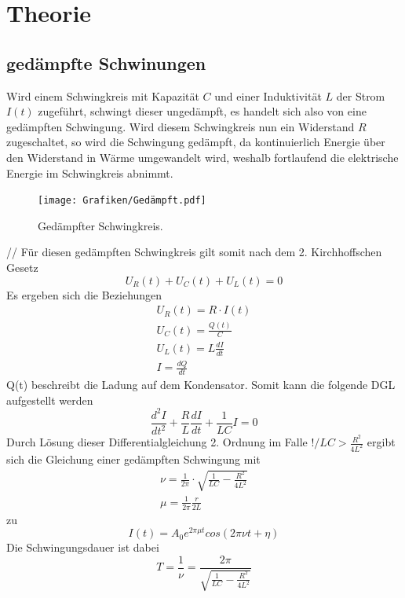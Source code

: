 \section{Theorie}

\subsection{gedämpfte Schwinungen}

Wird einem Schwingkreis mit Kapazität $C$ und einer Induktivität $L$ der Strom $I(t)$ zugeführt, schwingt dieser ungedämpft, es handelt sich also von eine gedämpften Schwingung.
Wird diesem Schwingkreis nun ein Widerstand $R$ zugeschaltet, so wird die Schwingung gedämpft, da kontinuierlich Energie über den Widerstand in Wärme umgewandelt wird, weshalb fortlaufend die elektrische Energie im Schwingkreis abnimmt.
\begin{figure}[h]
  \centering
  \texttt{[image: Grafiken/Gedämpft.pdf]}
  \caption{Gedämpfter Schwingkreis. \cite{1}}
  \label{fig:Gedämpft}
\end{figure}
// 
Für diesen gedämpften Schwingkreis gilt somit nach dem 2. Kirchhoffschen Gesetz
\begin{equation}
	U_R(t) + U_C(t) + U_L(t) = 0
\end{equation}
Es ergeben sich die Beziehungen
\begin{gather}
	U_R(t) = R\cdot I (t) \\
	U_C(t) = \frac{Q(t)}{C}\\
	U_L(t) = L\frac{dI}{dt}\\
	I =\frac{dQ}{dt}
\end{gather}
 Q(t) beschreibt die Ladung auf dem Kondensator.
 Somit kann die folgende DGL aufgestellt werden
 \begin{equation}
 	\frac{d^2 I}{dt^2} + \frac{R}{L}\frac{dI}{dt} + \frac{1}{LC} I = 0
\end{equation}
Durch Lösung dieser Differentialgleichung 2. Ordnung im Falle $!/LC > \frac{R^2}{4L^2}$ ergibt sich die Gleichung einer gedämpften Schwingung mit 
\begin{gather}
	\nu = \frac{1}{2\pi} \cdot \sqrt{\frac{1}{LC}-\frac{R^2}{4L^2}}\\
	\mu = \frac{1}{2\pi}\frac{r}{2L}
\end{gather}
zu
\begin{equation}
	I(t) = A_0e^{2\pi \mu t}cos(2\pi \nu t + \eta)
\end{equation}
Die Schwingungsdauer ist dabei
\begin{equation}
	T = \frac{1}{\nu} = \frac{2\pi}{\sqrt{\frac{1}{LC}-\frac{R^2}{4L^2}}}
\end{equation}
